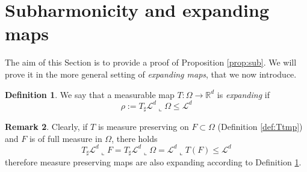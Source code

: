 \documentclass[11pt, twoside, reqno]{amsart}
\theoremstyle{definition} \newtheorem{definition}{Definition}[section]
\theoremstyle{definition} \newtheorem{remark}[definition]{Remark}
\theoremstyle{plain} \newtheorem{lemma}[definition]{Lemma}
\theoremstyle{plain} \newtheorem{proposition}[definition]{Proposition}
\theoremstyle{plain} \newtheorem{theorem}[definition]{Theorem}
\theoremstyle{plain} \newtheorem{corollary}[definition]{Corollary}
\theoremstyle{definition} \newtheorem{example}[definition]{Example}
\theoremstyle{plain} \newtheorem{claim}[clai]{Claim}
\theoremstyle{definition} \newtheorem{assumption}[definition]{Assumption}
\newcommand{\1}{\mathbbm 1}
\numberwithin{equation}{section} %
\theoremstyle{plain} \newtheorem*{theorem*}{Theorem}
\theoremstyle{plain} \newtheorem{mthm}[maintheorem]{Main Theorem}
\theoremstyle{plain} \newtheorem*{mthm*}{Main Theorem}
\theoremstyle{plain} \newtheorem*{conjecture*}{Conjecture}
\theoremstyle{plain} \newtheorem{conjecture}[definition]{Conjecture}
\theoremstyle{plain} \newtheorem*{problem*}{Problem}
\begin{document}
\section{Subharmonicity and expanding maps}\label{sec:sub}

The aim of this Section is to provide a proof of Proposition \ref{prop:sub}. We will prove it in the more general setting of \emph{expanding maps}, that we now introduce.


\begin{definition}\label{def:Texp}
We say that a measurable map $T : \Omega \to \mathbb R^d$ is \emph{expanding} if  
\begin{equation}\label{eq:expanding}
   \rho := T_\sharp \mathscr L^d \llcorner \Omega \leq \mathscr L^d
\end{equation}
\end{definition}

\begin{remark}\label{rem:mpexp}
Clearly, if $T$ is measure preserving on $F \subset \Omega$ (Definition \ref{def:Ttmp}) and $F$ is of full measure in $\Omega$, there holds $$T_\sharp \mathscr L^d \llcorner F =  T_\sharp \mathscr L^d \llcorner \Omega = \mathscr L^d \llcorner T(F) \leq \mathscr L^d$$ therefore measure preserving maps are also expanding according to Definition \ref{def:Texp}.
\end{remark}
\end{document}
